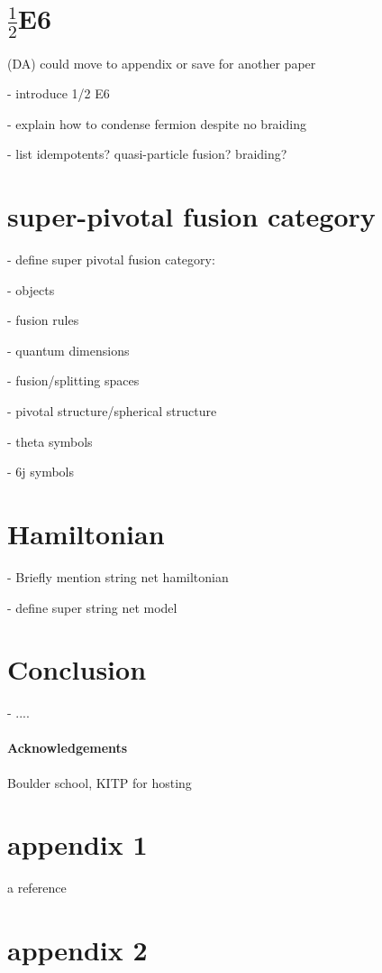 \documentclass[11pt]{article}
\newcommand{\dave}[1]{{\color{ao(english)}\footnotesize{(DA) #1}}}
\numberwithin{equation}{section}
\begin{document}
\section{$\frac{1}{2}$E6}

\dave{could move to appendix or save for another paper}

- introduce 1/2 E6

- explain how to condense fermion despite no braiding

- list idempotents? quasi-particle fusion? braiding? 

\section{super-pivotal fusion category}

- define super pivotal fusion category:

- objects

- fusion rules

- quantum dimensions

- fusion/splitting spaces

- pivotal structure/spherical structure

- theta symbols

- 6j symbols


 
 \section{Hamiltonian}
 
 - Briefly mention string net hamiltonian
 
 - define super string net model 
 
 \section{Conclusion}
 - ....
 \paragraph{Acknowledgements}
 Boulder school, KITP for hosting
 
 

{}




\clearpage
\appendix
\section{appendix 1}
a reference \cite{usher2016}
\section{appendix 2}


\end{document}
